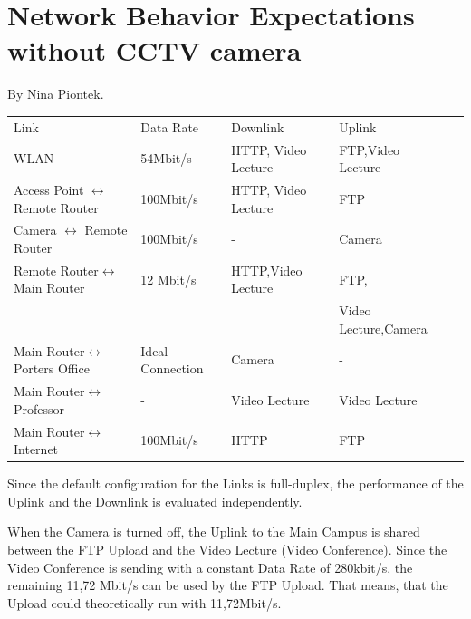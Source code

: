 \documentclass[a4paper,10pt]{book}\usepackage{graphicx}
\begin{document}
\section{Network Behavior  Expectations without CCTV camera}
By Nina Piontek.

\begin{minipage}[t]{0.5\textwidth}
\begin{tabular}{|l|l|l|l|l|}
\cline{1-4}
 Link & Data Rate  & Downlink  & Uplink  \\ \cline{1-4}
 WLAN & 54Mbit/s  & HTTP, Video Lecture & FTP,Video Lecture \\ \cline{1-4}
 Access Point $\leftrightarrow$ Remote Router & 100Mbit/s  &HTTP, Video Lecture& FTP  \\ \cline{1-4}
 Camera $\leftrightarrow$ Remote Router & 100Mbit/s  & - & Camera\\ \cline{1-4}
 Remote Router$\leftrightarrow$Main Router&12 Mbit/s&HTTP,Video Lecture& FTP, \\ 
 & & & Video Lecture,Camera \\ \cline{1-4}
 Main Router$\leftrightarrow $ Porters Office &Ideal Connection &Camera& - \\ \cline{1-4}
 Main Router$\leftrightarrow $ Professor & -  &Video Lecture&Video Lecture \\ \cline{1-4}
 Main Router$\leftrightarrow $ Internet &100Mbit/s &HTTP& FTP \\ \cline{1-4}
\end{tabular}
\end{minipage}

Since the default configuration for the Links is full-duplex, the performance of the Uplink and the Downlink is evaluated independently.
\par When the Camera is turned off, the Uplink to the Main Campus is shared between the FTP Upload and the Video Lecture (Video Conference).
Since the Video Conference is sending with a constant Data Rate of 280kbit/s, the remaining 
11,72 Mbit/s can be used by the FTP Upload. That means, that the Upload could theoretically run with 11,72Mbit/s.
\end{document}
